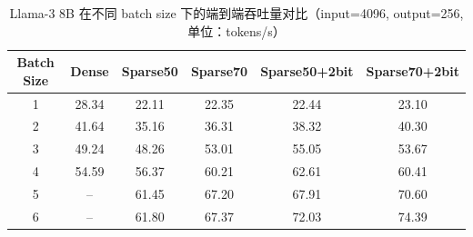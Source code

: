 \begin{table}[t]
\centering
\caption{Llama-3 8B 在不同 batch size 下的端到端吞吐量对比（input=4096, output=256, 单位：tokens/s）}
\label{tab:end2end-throughput-bs}
\begin{tabular}{cccccc}
\toprule
Batch Size & Dense & Sparse50 & Sparse70 & Sparse50+2bit & Sparse70+2bit \\
\midrule
1 & 28.34 & 22.11 & 22.35 & 22.44 & 23.10 \\
2 & 41.64 & 35.16 & 36.31 & 38.32 & 40.30 \\
3 & 49.24 & 48.26 & 53.01 & 55.05 & 53.67 \\
4 & 54.59 & 56.37 & 60.21 & 62.61 & 60.41 \\
5 & -- & 61.45 & 67.20 & 67.91 & 70.60 \\
6 & -- & 61.80 & 67.37 & 72.03 & 74.39 \\
\bottomrule
\end{tabular}
\end{table}
